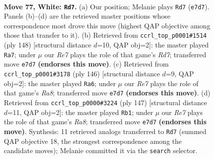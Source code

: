 \documentclass[11pt]{article}
\begin{document}
\clearpage

\begin{figure}[p]\centering
\begin{subfigure}{0.46\textwidth}\centering
\resizebox{\linewidth}{!}{%
\newchessgame
\chessboard[
  setfen={5rk1/P3R3/8/8/8/7K/8/8 w - - 23 77},
  showmover=false,
  pgfstyle=straightmove, color=movearrow, markmove={e7-d7}
]}
\caption{}
\end{subfigure}\hfill
\begin{subfigure}{0.46\textwidth}\centering
\resizebox{\linewidth}{!}{%
\newchessgame
\chessboard[
  setfen={8/3R4/8/6pP/4kr2/8/8/3K4 w - - 16 75},
  showmover=false,
  pgfstyle=straightmove, color=movearrow, markmove={d7-a7}
]}
\caption{}
\end{subfigure}
\\[4pt]
\begin{subfigure}{0.46\textwidth}\centering
\resizebox{\linewidth}{!}{%
\newchessgame
\chessboard[
  setfen={R7/4rk2/8/5PK1/8/5P2/8/8 w - - 17 74},
  showmover=false,
  pgfstyle=straightmove, color=movearrow, markmove={a8-a6}
]}
\caption{}
\end{subfigure}\hfill
\begin{subfigure}{0.46\textwidth}\centering
\resizebox{\linewidth}{!}{%
\newchessgame
\chessboard[
  setfen={8/8/6k1/6p1/8/8/5RKP/r7 b - - 11 74},
  showmover=false,
  pgfstyle=straightmove, color=movearrow, markmove={a1-b1}
]}
\caption{}
\end{subfigure}
\caption{\textbf{Move 77, White: \texttt{Rd7}.} (a) Our position; Melanie plays \texttt{Rd7} (\texttt{e7d7}). Panels (b)--(d) are the retrieved master positions whose correspondence most drove this move (highest QAP objective among those that transfer to it). (b) Retrieved from \texttt{ccrl\_top\_p0001\#1514} (ply 148) [structural distance $d$=10, QAP obj=2]: the master played \texttt{Ra7}; under $\mu$ our \emph{Re7} plays the role of that game's \emph{Rd7}; transferred move \texttt{e7d7} \textbf{(endorses this move)}. (c) Retrieved from \texttt{ccrl\_top\_p0001\#3178} (ply 146) [structural distance $d$=9, QAP obj=2]: the master played \texttt{Ra6}; under $\mu$ our \emph{Re7} plays the role of that game's \emph{Ra8}; transferred move \texttt{e7d7} \textbf{(endorses this move)}. (d) Retrieved from \texttt{ccrl\_top\_p0000\#3224} (ply 147) [structural distance $d$=11, QAP obj=2]: the master played \texttt{Rb1}; under $\mu$ our \emph{Re7} plays the role of that game's \emph{Ra8}; transferred move \texttt{e7d7} \textbf{(endorses this move)}. Synthesis: 11 retrieved analogs transferred to \texttt{Rd7} (summed QAP objective 18, the strongest correspondence among the candidate moves); Melanie committed it via the \texttt{search} selector.}
\label{fig:thought-m152}
\end{figure}
\end{document}
